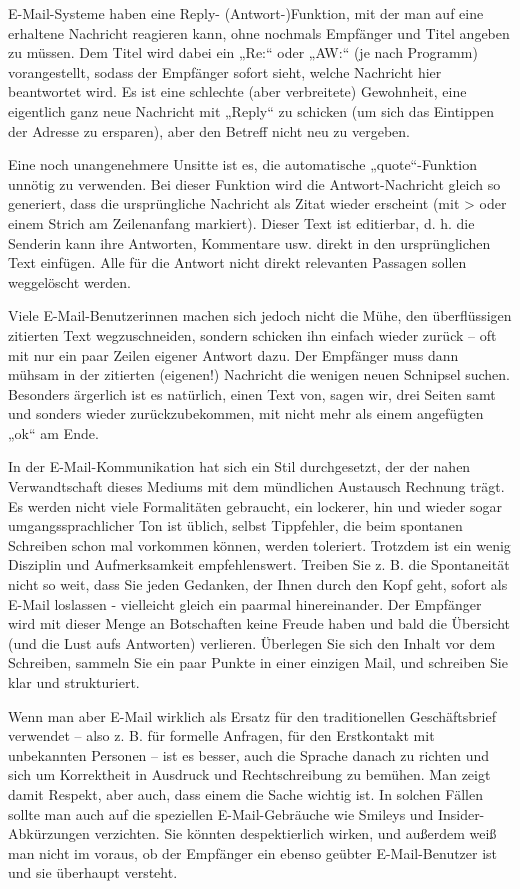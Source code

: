 \documentclass[]{book}
\theoremstyle{definition}
\theoremstyle{definition}
\theoremstyle{definition}
\theoremstyle{remark}
\begin{document}
E-Mail-Systeme haben eine Reply- (Antwort-)Funktion, mit der man auf
eine erhaltene Nachricht reagieren kann, ohne nochmals Empfänger und
Titel angeben zu müssen. Dem Titel wird dabei ein „Re:`` oder „AW:`` (je
nach Programm) vorangestellt, sodass der Empfänger sofort sieht, welche
Nachricht hier beantwortet wird. Es ist eine schlechte (aber
verbreitete) Gewohnheit, eine eigentlich ganz neue Nachricht mit
„Reply`` zu schicken (um sich das Eintippen der Adresse zu ersparen),
aber den Betreff nicht neu zu vergeben.

Eine noch unangenehmere Unsitte ist es, die automatische
„quote``-Funktion unnötig zu verwenden. Bei dieser Funktion wird die
Antwort-Nachricht gleich so generiert, dass die ursprüngliche Nachricht
als Zitat wieder erscheint (mit \textgreater{} oder einem Strich am
Zeilenanfang markiert). Dieser Text ist editierbar, d. h. die Senderin
kann ihre Antworten, Kommentare usw. direkt in den ursprünglichen Text
einfügen. Alle für die Antwort nicht direkt relevanten Passagen sollen
weggelöscht werden.

Viele E-Mail-Benutzerinnen machen sich jedoch nicht die Mühe, den
überflüssigen zitierten Text wegzuschneiden, sondern schicken ihn
einfach wieder zurück -- oft mit nur ein paar Zeilen eigener Antwort
dazu. Der Empfänger muss dann mühsam in der zitierten (eigenen!)
Nachricht die wenigen neuen Schnipsel suchen. Besonders ärgerlich ist es
natürlich, einen Text von, sagen wir, drei Seiten samt und sonders
wieder zurückzubekommen, mit nicht mehr als einem angefügten „ok`` am
Ende.

In der E-Mail-Kommunikation hat sich ein Stil durchgesetzt, der der
nahen Verwandtschaft dieses Mediums mit dem mündlichen Austausch
Rechnung trägt. Es werden nicht viele Formalitäten gebraucht, ein
lockerer, hin und wieder sogar umgangssprachlicher Ton ist üblich,
selbst Tippfehler, die beim spontanen Schreiben schon mal vorkommen
können, werden toleriert. Trotzdem ist ein wenig Disziplin und
Aufmerksamkeit empfehlenswert. Treiben Sie z. B. die Spontaneität nicht
so weit, dass Sie jeden Gedanken, der Ihnen durch den Kopf geht, sofort
als E-Mail loslassen - vielleicht gleich ein paarmal hinereinander. Der
Empfänger wird mit dieser Menge an Botschaften keine Freude haben und
bald die Übersicht (und die Lust aufs Antworten) verlieren. Überlegen
Sie sich den Inhalt vor dem Schreiben, sammeln Sie ein paar Punkte in
einer einzigen Mail, und schreiben Sie klar und strukturiert.

Wenn man aber E-Mail wirklich als Ersatz für den traditionellen
Geschäftsbrief verwendet -- also z. B. für formelle Anfragen, für den
Erstkontakt mit unbekannten Personen -- ist es besser, auch die Sprache
danach zu richten und sich um Korrektheit in Ausdruck und
Rechtschreibung zu bemühen. Man zeigt damit Respekt, aber auch, dass
einem die Sache wichtig ist. In solchen Fällen sollte man auch auf die
speziellen E-Mail-Gebräuche wie Smileys und Insider-Abkürzungen
verzichten. Sie könnten despektierlich wirken, und außerdem weiß man
nicht im voraus, ob der Empfänger ein ebenso geübter E-Mail-Benutzer ist
und sie überhaupt versteht.
\end{document}

